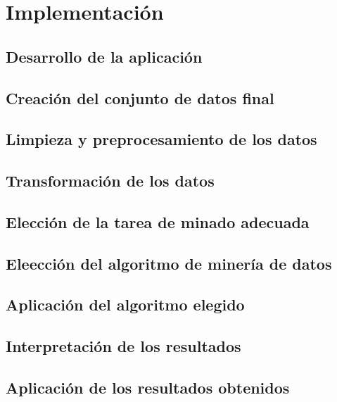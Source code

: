 \chapter{Implementaci\'on}
\label{cap:implementacion}

\section{Desarrollo de la aplicación}
\section{Creación del conjunto de datos final}
\section{Limpieza y preprocesamiento de los datos}
\section{Transformación de los datos}
\section{Elección de la tarea de minado adecuada}
\section{Eleección del algoritmo de minería de datos}
\section{Aplicación del algoritmo elegido}
\section{Interpretación de los resultados}
\section{Aplicación de los resultados obtenidos}